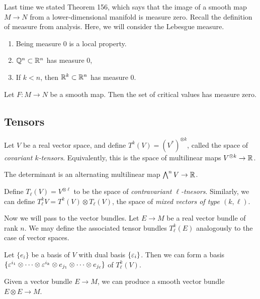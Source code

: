 \documentclass[twoside, 10pt]{article}
\begin{document}
    Last time we stated Theorem 156, which says that the image of a smooth map
    $M \to N$ from a lower-dimensional manifold is measure zero. Recall the
    definition of measure from analysis. Here, we will consider the Lebesgue
    measure.

    \begin{rmk} \begin{enumerate} \item Being measure $0$ is a local property.
    \item $\mathbb{Q}^n \subset \mathbb{R}^n$ has measure $0$, \item If $k < n$, then $\mathbb{R}^k
\subset \mathbb{R}^n$ has measure $0$.  \end{enumerate} \end{rmk}

    \begin{thm}[Sard] Let $F:M \to N$ be a smooth map. Then the set of critical
    values has measure zero.  \end{thm}

    \subsection{Tensors}%
    
    Let $V$ be a real vector space, and define $T^k(V) = (V^*)^{\otimes k}$,
    called the space of \textit{covariant $k$-tensors}. Equivalently, this is
    the space of multilinear maps $V^{\otimes k} \to \mathbb{R}$.

    \begin{exm} The determinant is an alternating multilinear map $\bigwedge^n
    V \to \mathbb{R}$.  \end{exm}

    Define $T_{\ell}(V) = V^{\otimes \ell}$ to be the space of
    \textit{contravariant $\ell$-tnesors}. Similarly, we can define $T_{\ell}^k
    V = T^k(V) \otimes T_{\ell}(V)$, the space of \textit{mixed vectors of type
    $(k,\ell)$}.

    Now we will pass to the vector bundles. Let $E \to M$ be a real vector
    bundle of rank $n$. We may define the associated tensor bundles
    $T_{\ell}^k(E)$ analogously to the case of vector spaces.

    Let $\{e_i\}$ be a basis of $V$ with dual basis $\{ \varepsilon_i \}$. Then we can
    form a basis $\{ \varepsilon^{i_1} \otimes \cdots \otimes \varepsilon^{i_k} \otimes e_{j_1}
    \otimes \cdots \otimes e_{j_{\ell}} \}$ of $T_{\ell}^k(V)$. 

    \begin{exm} Given a vector bundle $E \to M$, we can produce a smooth vector
    bundle $E \otimes E \to M$.  \end{exm}
\end{document}
